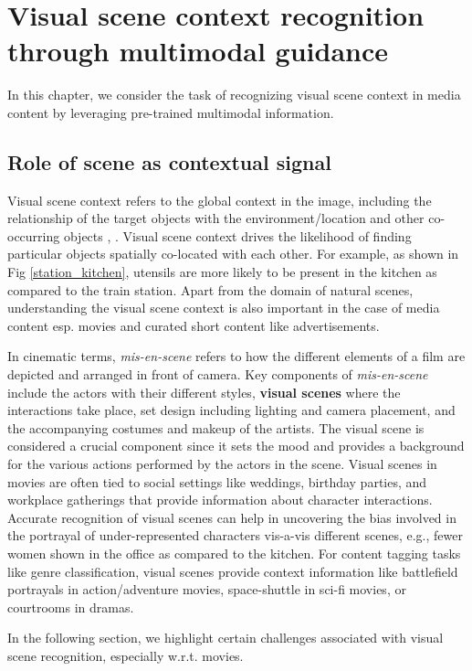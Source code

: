 \chapter{Visual scene context recognition through multimodal guidance}

In this chapter, we consider the task of recognizing visual scene context in media content by leveraging pre-trained multimodal information.  
\section{Role of scene as contextual signal}
Visual scene context refers to the global context in the image, including the relationship of the target objects with the environment/location and other co-occurring objects \cite{Bar2004VisualOI}, \cite{Qiao2021ObjectLevelSC}. Visual scene context drives the likelihood of finding particular objects spatially co-located with each other. For example, as shown in Fig \ref{station_kitchen}, utensils are more likely to be present in the kitchen as compared to the train station. 
Apart from the domain of natural scenes, understanding the visual scene context is also important in the case of media content \cite{CMI} esp. movies and curated short content like advertisements. 
\par
In cinematic terms, \textit{mis-en-scene} \cite{Bordwell1979FilmAA} refers to how the different elements of a film are depicted and arranged in front of camera. Key components of \textit{mis-en-scene} include the actors with their different styles, \textbf{visual scenes} where the interactions take place, set design including lighting and camera placement, and the accompanying costumes and makeup of the artists. The visual scene is considered a crucial component since it sets the mood and provides a background for the various actions performed by the actors in the scene. Visual scenes in movies are often tied to social settings like weddings, birthday parties, and workplace gatherings that provide information about character interactions. Accurate recognition of visual scenes can help in uncovering the bias involved in the portrayal of under-represented characters vis-a-vis different scenes, e.g., fewer women shown in the office as compared to the kitchen. For content tagging tasks like genre classification, visual scenes provide context information like battlefield portrayals in action/adventure movies, space-shuttle in sci-fi movies, or courtrooms in dramas.
\par 
In the following section, we highlight certain challenges associated with visual scene recognition, especially w.r.t. movies.
